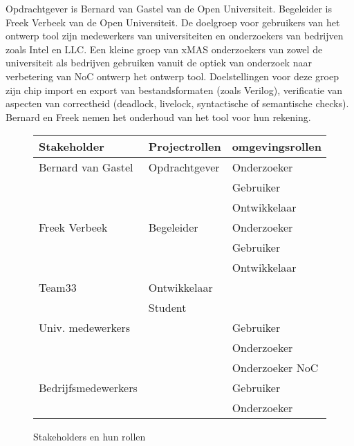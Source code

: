 \documentclass[a4paper,11pt,twoside,draft]{article}
\begin{document}
Opdrachtgever is Bernard van Gastel van de Open Universiteit. Begeleider is Freek Verbeek van de Open Universiteit.
De doelgroep voor gebruikers van het ontwerp tool zijn medewerkers van universiteiten en onderzoekers van bedrijven zoals
Intel en LLC. Een kleine groep van xMAS onderzoekers van zowel de universiteit als bedrijven gebruiken vanuit de optiek
van onderzoek naar verbetering van NoC ontwerp het ontwerp tool. Doelstellingen voor deze groep zijn chip import
en export van bestandsformaten (zoals Verilog), verificatie van aspecten van correctheid (deadlock, livelock,
syntactische of semantische checks). Bernard en Freek nemen het onderhoud van het tool voor hun rekening.


\begin{figure}
{\tiny
\begin{center}
\begin{tabular}{lll}\hline
{\bf Stakeholder}    & {\bf Projectrollen}   & {\bf omgevingsrollen} \\\hline
Bernard van Gastel   & Opdrachtgever         & Onderzoeker \\
                     &                       & Gebruiker \\
                     &                       & Ontwikkelaar \\
Freek Verbeek        & Begeleider            & Onderzoeker \\
                     &                       & Gebruiker \\
                     &                       & Ontwikkelaar \\
Team33               & Ontwikkelaar          & \\
                     & Student               & \\
Univ. medewerkers    &                       & Gebruiker \\
                     &                       & Onderzoeker \\
                     &                       & Onderzoeker NoC \\
Bedrijfsmedewerkers  &                       & Gebruiker \\
                     &                       & Onderzoeker \\
\hline
\end{tabular}
\end{center}
}%
\caption{Stakeholders en hun rollen}\label{fig:stakeholders}
\end{figure}
\end{document}
